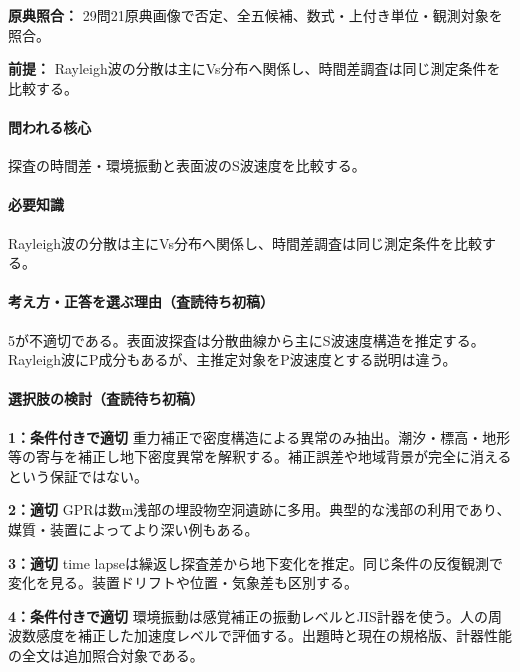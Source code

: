 \noindent\textbf{原典照合：} 29問21原典画像で否定、全五候補、数式・上付き単位・観測対象を照合。\par

\noindent\textbf{前提：} Rayleigh波の分散は主にVs分布へ関係し、時間差調査は同じ測定条件を比較する。\par

\paragraph{問われる核心} 探査の時間差・環境振動と表面波のS波速度を比較する。

\paragraph{必要知識} Rayleigh波の分散は主にVs分布へ関係し、時間差調査は同じ測定条件を比較する。

\paragraph{考え方・正答を選ぶ理由（査読待ち初稿）} 5が不適切である。表面波探査は分散曲線から主にS波速度構造を推定する。Rayleigh波にP成分もあるが、主推定対象をP波速度とする説明は違う。

\paragraph{選択肢の検討（査読待ち初稿）}\mbox{}\par

\noindent\textbf{1：条件付きで適切} 重力補正で密度構造による異常のみ抽出。潮汐・標高・地形等の寄与を補正し地下密度異常を解釈する。補正誤差や地域背景が完全に消えるという保証ではない。\par

\noindent\textbf{2：適切} GPRは数m浅部の埋設物空洞遺跡に多用。典型的な浅部の利用であり、媒質・装置によってより深い例もある。\par

\noindent\textbf{3：適切} time lapseは繰返し探査差から地下変化を推定。同じ条件の反復観測で変化を見る。装置ドリフトや位置・気象差も区別する。\par

\noindent\textbf{4：条件付きで適切} 環境振動は感覚補正の振動レベルとJIS計器を使う。人の周波数感度を補正した加速度レベルで評価する。出題時と現在の規格版、計器性能の全文は追加照合対象である。\par

